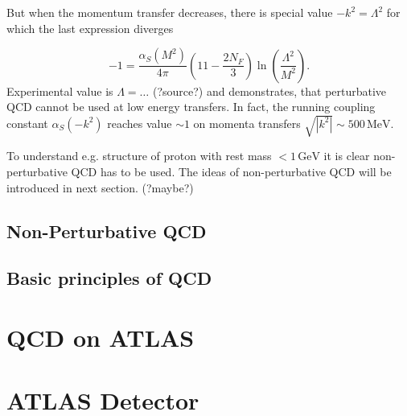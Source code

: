 \documentclass[a4paper,11pt]{report}
\newcommand{\GeV}{\,\text{GeV}}
\newcommand{\MeV}{\,\text{MeV}}
\begin{document}
But when the momentum transfer decreases, there is special value
$-k^2=\Lambda^2$ for which the last expression diverges

\begin{equation}
  -1 = \frac{\alpha_S(M^2)}{4\pi} \left( 11 - \frac{2N_F}{3} \right)
  \ln \left( \frac{\Lambda^2}{M^2} \right).
  \label{eq:RunningLambda}
\end{equation}
Experimental value is $\Lambda=\dots$ (?source?) and demonstrates, that
perturbative QCD cannot be used at low energy transfers. In fact, the running
coupling constant $\alpha_S(-k^2)$ reaches value $\sim 1$ on momenta
transfers $\sqrt{\left| k^2 \right|} \sim 500\MeV$.

To understand e.g. structure of proton with rest mass $< 1\GeV$ it is clear
non-perturbative QCD has to be used. The ideas of non-perturbative QCD will be
introduced in next section. (?maybe?)





\section{Non-Perturbative QCD}


\section{Basic principles of QCD}

\chapter{QCD on ATLAS}

\chapter{ATLAS Detector}
\label{ch:intro}


\clearpage
\listoffigures
{}


\clearpage
\listoftables
{}



\clearpage


\end{document}
